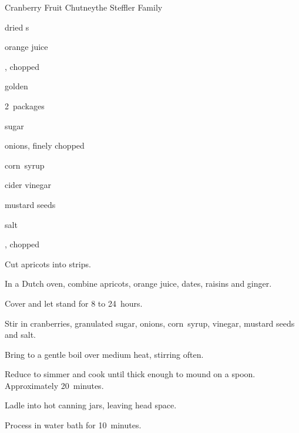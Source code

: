\begin{recipe}{Cranberry Fruit Chutney}{the Steffler Family}{}

\begin{ingredients}
\item {} dried s
\item \C{2\half} orange juice
\item {} , chopped
\item \C{\half} golden 
\item 2~packages 
\item \C{1\half} sugar
\item \C{1\quarter} onions, finely chopped
\item \C{\threequarter} corn~syrup
\item \C{\threequarter} cider vinegar
\item \tp{1\half} mustard seeds
\item \tp{\quarter} salt
\item \C{\half} , chopped
\end{ingredients}

\begin{directions}
\item Cut apricots into \cm{\half} strips.
\item In a Dutch oven, combine apricots, orange juice, dates, raisins and ginger.
\item Cover and let stand for 8 to 24~hours.
\item Stir in cranberries, granulated sugar, onions, corn~syrup, vinegar, mustard seeds and salt.
\item Bring to a gentle boil over medium heat, stirring often.
\item Reduce to simmer and cook until thick enough to mound on a spoon. Approximately 20~minutes.
\item Ladle into  hot canning jars, leaving \cm{\half} head space.
\item Process in water bath for 10~minutes.
\end{directions}
\end{recipe}

